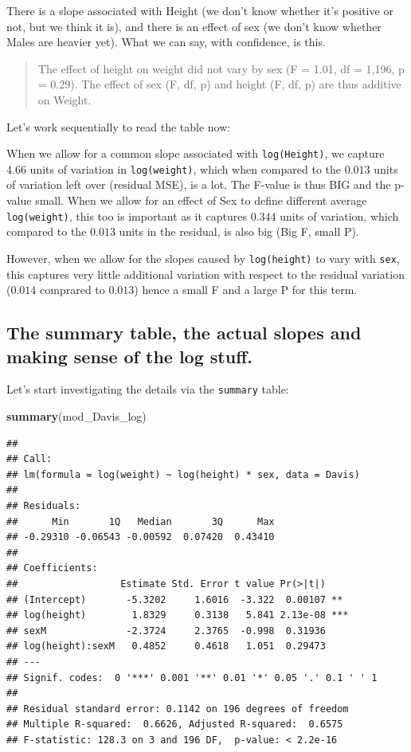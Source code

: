 \documentclass[
]{book}
\newenvironment{Shaded}{\begin{snugshade}}{\end{snugshade}}
\newcommand{\FunctionTok}[1]{\textcolor[rgb]{0.13,0.29,0.53}{\textbf{#1}}}
\newcommand{\NormalTok}[1]{#1}
\begin{document}
There is a slope associated with Height (we don't know whether it's positive or not, but we think it is), and there is an effect of sex (we don't know whether Males are heavier yet). What we can say, with confidence, is this.

\begin{quote}
The effect of height on weight did not vary by sex (F = 1.01, df = 1,196, p = 0.29). The effect of sex (F, df, p) and height (F, df, p) are thus additive on Weight.
\end{quote}

Let's work sequentially to read the table now:

When we allow for a common slope associated with \texttt{log(Height)}, we capture \(4.66\) units of variation in \texttt{log(weight)}, which when compared to the \(0.013\) units of variation left over (residual MSE), is a lot. The F-value is thus BIG and the p-value small. When we allow for an effect of Sex to define different average \texttt{log(weight)}, this too is important as it captures \(0.344\) units of variation, which compared to the \(0.013\) units in the residual, is also big (Big F, small P).

However, when we allow for the slopes caused by \texttt{log(height)} to vary with \texttt{sex}, this captures very little additional variation with respect to the residual variation (\(0.014\) comprared to \(0.013\)) hence a small F and a large P for this term.

\hypertarget{the-summary-table-the-actual-slopes-and-making-sense-of-the-log-stuff.}{%
\subsection{The summary table, the actual slopes and making sense of the log stuff.}\label{the-summary-table-the-actual-slopes-and-making-sense-of-the-log-stuff.}}

Let's start investigating the details via the \texttt{summary} table:

\begin{Shaded}
\begin{Highlighting}[]
\FunctionTok{summary}\NormalTok{(mod\_Davis\_log)}
\end{Highlighting}
\end{Shaded}

\begin{verbatim}
## 
## Call:
## lm(formula = log(weight) ~ log(height) * sex, data = Davis)
## 
## Residuals:
##      Min       1Q   Median       3Q      Max 
## -0.29310 -0.06543 -0.00592  0.07420  0.43410 
## 
## Coefficients:
##                  Estimate Std. Error t value Pr(>|t|)    
## (Intercept)       -5.3202     1.6016  -3.322  0.00107 ** 
## log(height)        1.8329     0.3138   5.841 2.13e-08 ***
## sexM              -2.3724     2.3765  -0.998  0.31936    
## log(height):sexM   0.4852     0.4618   1.051  0.29473    
## ---
## Signif. codes:  0 '***' 0.001 '**' 0.01 '*' 0.05 '.' 0.1 ' ' 1
## 
## Residual standard error: 0.1142 on 196 degrees of freedom
## Multiple R-squared:  0.6626, Adjusted R-squared:  0.6575 
## F-statistic: 128.3 on 3 and 196 DF,  p-value: < 2.2e-16
\end{verbatim}
\end{document}
